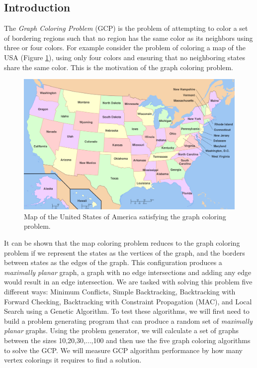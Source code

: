 \documentclass[twoside]{article}
\begin{document}
\begin{multicols}{2}
\section{Introduction}
The \textit{Graph Coloring Problem} (GCP) is the problem of attempting to color a set of bordering regions such that no region has the same color as its neighbors using three or four colors. For example consider the problem of coloring a map of the USA (Figure \ref{usa}), using only four colors and ensuring that no neighboring states share the same color. This is the motivation of the graph coloring problem. 
\begin{figure}[H]
	\centering
	\includegraphics[width=\linewidth]{../images/usa}
	\caption{Map of the United States of America satisfying the graph coloring problem.}
	\label{usa}
\end{figure}
It can be shown that the map coloring problem reduces to the graph coloring problem if we represent the states as the vertices of the graph, and the borders between states as the edges of the graph. This configuration produces a \textit{maximally planar} graph, a graph with no edge intersections and adding any edge would result in an edge intersection.
We are tasked with solving this problem five different ways: Minimum Conflicts, Simple Backtracking, Backtracking with Forward Checking, Backtracking with Constraint Propagation (MAC), and Local Search using a Genetic Algorithm. To test these algorithms, we will first need to build a problem generating program that can produce a random set of \textit{maximally planar} graphs. Using the problem generator, we will calculate a set of graphs between the sizes {10,20,30,...,100} and then use the five graph coloring algorithms to solve the GCP. We will measure GCP algorithm performance by how many vertex colorings it requires to find a solution.

\end{multicols}
\end{document}
